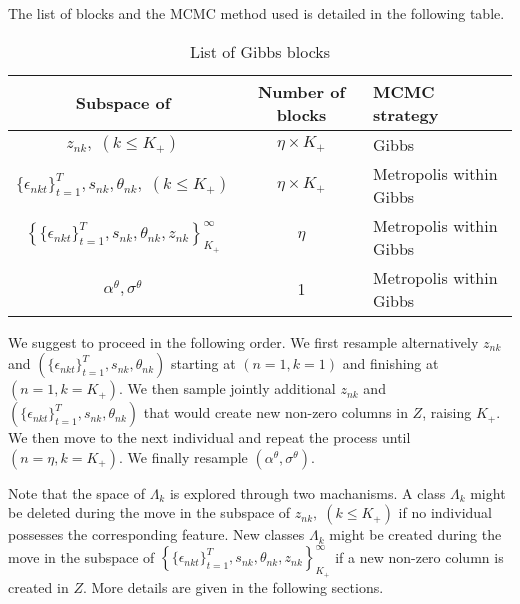 \documentclass[12pt]{article}
\begin{document}
The list of blocks and the MCMC method used is detailed in the following table.

\begin{table}[H]
	\centering
	\caption{List of Gibbs blocks}
	\label{tab:gibbsblocks}
	\bgroup
		\def\arraystretch{2}
		\begin{tabular}{|c|c|l|}
			\hline
			Subspace of  & Number of blocks & MCMC strategy \\ \hline
			$z_{nk}, \;(k \leq K_+)$ & $\eta \times K_+$ & Gibbs \\ \hline
			$\{\epsilon_{nkt}\}_{t=1}^T, s_{nk}, \theta_{nk}, \;(k \leq K_+)$ & $\eta \times K_+$ & Metropolis within Gibbs \\ \hline
			$\left\{ \{\epsilon_{nkt}\}_{t=1}^T, s_{nk}, \theta_{nk},z_{nk} \right\}_{K_+}^{\infty}$  & $\eta$ & Metropolis within Gibbs \footnotemark \\ \hline
			
			$\alpha^\theta, \sigma^\theta$ & 1 &  Metropolis within Gibbs \\
			\hline
		\end{tabular}
	\egroup
\end{table} 

We suggest to proceed in the following order. We first resample alternatively $z_{nk}$ and $\left( \{\epsilon_{nkt}\}_{t=1}^T, s_{nk}, \theta_{nk} \right)$ starting at $(n=1,k=1)$ and finishing at $(n=1,k=K_+)$. We then sample jointly additional $z_{nk}$ and $\left(\{\epsilon_{nkt}\}_{t=1}^T, s_{nk}, \theta_{nk}\right)$ that would create new non-zero columns in $Z$, raising $K_+$. We then move to the next individual and repeat the process until $(n=\eta,k=K_+)$. We finally resample $\left( \alpha^\theta, \sigma^\theta \right) $.

Note that the space of $\Lambda_{k}$ is explored through two machanisms. A class $\Lambda_{k}$ might be deleted during the move in the subspace of $z_{nk}, \;(k \leq K_+)$ if no individual possesses the corresponding feature. New classes $\Lambda_{k}$ might be created during the move in the subspace of $\left\{ \{\epsilon_{nkt}\}_{t=1}^T, s_{nk}, \theta_{nk},z_{nk} \right\}_{K_+}^{\infty}$ if a new non-zero column is created in $Z$. More details are given in the following sections.  
\end{document}
